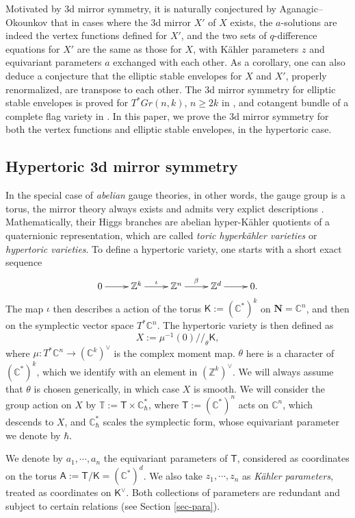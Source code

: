 \documentclass[10pt]{amsart}
\theoremstyle{definition}
\def\ZZ{{\mathbb{Z}}}
\def\CC{{\mathbb{C}}}
\def\TT{\mathbb{T}}
\newcommand{\bA}{\mathsf{A}}
\newcommand{\bT}{\mathsf{T}}
\newcommand{\bK}{\mathsf{K}}
\theoremstyle{definition}
\numberwithin{equation}{section}
\theoremstyle{Theorem}
\begin{document}
Motivated by 3d mirror symmetry, it is naturally conjectured by Aganagic--Okounkov \cite{AOelliptic} that in cases where the 3d mirror $X'$ of $X$ exists, the $a$-solutions are indeed the vertex functions defined for $X'$, and the two sets of $q$-difference equations for $X'$ are the same as those for $X$, with K\"ahler parameters $z$ and equivariant parameters $a$ exchanged with each other. As a corollary, one can also deduce a conjecture that the elliptic stable envelopes for $X$ and $X'$, properly renormalized, are transpose to each other. The 3d mirror symmetry for elliptic stable envelopes is proved for $T^* Gr (n, k)$, $n\geq 2k$ in \cite{RSVZ}, and cotangent bundle of a complete flag variety in \cite{RSVZ2}. In this paper, we prove the 3d mirror symmetry for both the vertex functions and elliptic stable envelopes, in the hypertoric case.


\subsection{Hypertoric 3d mirror symmetry}

In the special case of \emph{abelian} gauge theories, in other words, the gauge group is a torus, the mirror theory always exists and admits very explict descriptions \cite{PhysMir1, KS}. Mathematically, their Higgs branches are abelian hyper-K\"ahler quotients of a quaternionic representation, which are called \emph{toric hyperk\"ahler varieties} or \emph{hypertoric varieties}. To define a hypertoric variety, one starts with a short exact sequence
$$
\xymatrix{
	0 \ar[r] & \ZZ^k \ar[r]^\iota & \ZZ^n \ar[r]^\beta & \ZZ^d \ar[r] & 0.
}
$$
The map $\iota$ then describes a action of the torus $\bK := (\CC^*)^k$ on $\mathbf{N} = \CC^n$, and then on the symplectic vector space $T^*\CC^n$. The hypertoric variety is then defined as
$$
X := \mu^{-1} (0) /\!/_\theta \bK ,
$$
where $\mu: T^*\CC^n \to (\CC^k)^\vee$ is the complex moment map. $\theta$ here is a character of $(\CC^*)^k$, which we identify with an element in $(\ZZ^k)^\vee$. We will always assume that $\theta$ is chosen generically, in which case $X$ is smooth. We will consider the group action on $X$ by $\TT := \bT \times \CC^*_\hbar$, where $\bT := (\CC^*)^n$ acts on $\CC^n$, which descends to $X$, and $\CC^*_\hbar$ scales the symplectic form, whose equivariant parameter we denote by $\hbar$.

We denote by $a_1, \cdots, a_n$ the equivariant parameters of $\bT$, considered as coordinates on the torus $\bA := \bT / \bK = (\CC^*)^d$. We also take $z_1, \cdots, z_n$ as \emph{K\"ahler parameters}, treated as coordinates on $\bK^\vee$. Both collections of parameters are redundant and subject to certain relations (see Section \ref{sec-para}).
\end{document}
